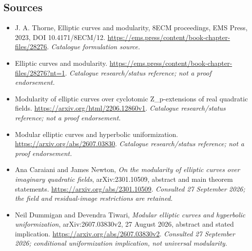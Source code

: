 \documentclass[11pt,a4paper]{article}
\numberwithin{equation}{section}
\begin{document}

\subsection{Sources}
\begin{itemize}\raggedright
\item[\textnormal{[S1]}]\hypertarget{source:30006690:1}{} J. A. Thorne, Elliptic curves and modularity, 8ECM proceedings, EMS Press, 2023, DOI 10.4171/8ECM/12.
\url{https://ems.press/content/book-chapter-files/28276}.
{\small\textit{Catalogue formulation source.}}
\item[\textnormal{[S2]}]\hypertarget{source:30006690:2}{} Elliptic curves and modularity.
\url{https://ems.press/content/book-chapter-files/28276?nt=1}.
{\small\textit{Catalogue research/status reference; not a proof endorsement.}}
\item[\textnormal{[S3]}]\hypertarget{source:30006690:3}{} Modularity of elliptic curves over cyclotomic Z\_p-extensions of real quadratic fields.
\url{https://arxiv.org/html/2206.12860v1}.
{\small\textit{Catalogue research/status reference; not a proof endorsement.}}
\item[\textnormal{[S4]}]\hypertarget{source:30006690:4}{} Modular elliptic curves and hyperbolic uniformization.
\url{https://arxiv.org/abs/2607.03830}.
{\small\textit{Catalogue research/status reference; not a proof endorsement.}}
\item[\textnormal{[E1]}]\hypertarget{extra:30006690:1}{} Ana Caraiani and James Newton,
\emph{On the modularity of elliptic curves over imaginary quadratic fields},
arXiv:2301.10509, abstract and main theorem statements.
\url{https://arxiv.org/abs/2301.10509}.
{\small\textit{Consulted 27 September 2026; the field and residual-image restrictions are retained.}}
\item[\textnormal{[E2]}]\hypertarget{extra:30006690:2}{} Neil Dummigan and Devendra Tiwari,
\emph{Modular elliptic curves and hyperbolic uniformization},
arXiv:2607.03830v2, 27 August 2026, abstract and stated implication.
\url{https://arxiv.org/abs/2607.03830v2}.
{\small\textit{Consulted 27 September 2026; conditional uniformization implication, not universal modularity.}}

\end{itemize}

\end{document}
